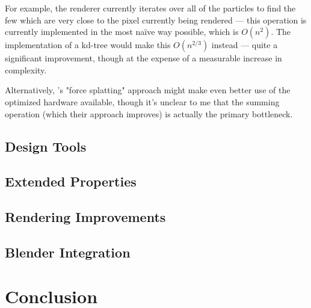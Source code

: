 \documentclass{acmsiggraph}
\begin{document}
For example, the renderer currently iterates over all of the particles to find the few which are very close to the pixel currently being rendered --- this operation is currently implemented in the most na\"{i}ve way possible, which is $O(n^2)$. The implementation of a kd-tree would make this $O(n^{2/3})$ instead --- quite a significant improvement, though at the expense of a measurable increase in complexity.

Alternatively, \cite{1281670}'s "force splatting" approach might make even better use of the optimized hardware available, though it's unclear to me that the summing operation (which their approach improves) is actually the primary bottleneck.

\subsection{Design Tools}

\subsection{Extended Properties}

\subsection{Rendering Improvements}

\subsection{Blender Integration}

\section{Conclusion}


\nocite{*}

\end{document}
